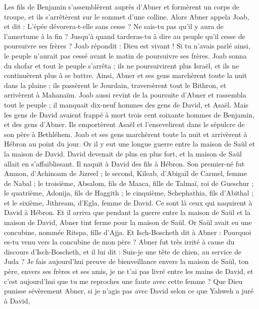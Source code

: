 \begin{multicols}{2}
Les fils de Benjamin s'assemblèrent auprès d'Abner et formèrent un corps de troupe, et ils s'arrêtèrent sur le sommet d'une colline.
Alors Abner appela Joab, et dit : L'épée dévorera-t-elle sans cesse ? Ne sais-tu pas qu'il y aura de l'amertume à la fin ? Jusqu'à quand tarderas-tu à dire au peuple qu'il cesse de poursuivre ses frères ?
Joab répondit : Dieu est vivant ! Si tu n'avais parlé ainsi, le peuple n'aurait pas cessé avant le matin de poursuivre ses frères.
Joab sonna du shofar et tout le peuple s'arrêta ; ils ne poursuivirent plus Israël, et ils ne continuèrent plus à se battre.
Ainsi, Abner et ses gens marchèrent toute la nuit dans la plaine ; ils passèrent le Jourdain, traversèrent tout le Bithron, et arrivèrent à Mahanaïm.
Joab aussi revint de la poursuite d'Abner et rassembla tout le peuple ; il manquait dix-neuf hommes des gens de David, et Asaël.
Mais les gens de David avaient frappé à mort trois cent soixante hommes de Benjamin, et des gens d'Abner.
Ils emportèrent Asaël et l'ensevelirent dans le sépulcre de son père à Bethléhem. Joab et ses gens marchèrent toute la nuit et arrivèrent à Hébron au point du jour.
\VerseOne{}Or il y eut une longue guerre entre la maison de Saül et la maison de David. David devenait de plus en plus fort, et la maison de Saül allait en s'affaiblissant.
Il naquit à David des fils à Hébron. Son premier-né fut Amnon, d'Achinoam de Jizreel ;
le second, Kileab, d'Abigaïl de Carmel, femme de Nabal ; le troisième, Absalom, fils de Maaca, fille de Talmaï, roi de Gueschur ;
le quatrième, Adonija, fils de Haggith ; le cinquième, Schephathia, fils d'Abithal ;
et le sixième, Jithream, d'Egla, femme de David. Ce sont là ceux qui naquirent à David à Hébron.
Et il arriva que pendant la guerre entre la maison de Saül et la maison de David, Abner tint ferme pour la maison de Saül.
Or Saül avait eu une concubine, nommée Ritspa, fille d'Ajja. Et Isch-Boscheth dit à Abner : Pourquoi es-tu venu vers la concubine de mon père ?
Abner fut très irrité à cause du discours d'Isch-Boscheth, et il lui dit : Suis-je une tête de chien, au service de Juda ? Je fais aujourd'hui preuve de bienveillance envers la maison de Saül, ton père, envers ses frères et ses amis, je ne t'ai pas livré entre les mains de David, et c'est aujourd'hui que tu me reproches une faute avec cette femme ?
Que Dieu punisse sévèrement Abner, si je n'agis pas avec David selon ce que Yahweh a juré à David,

\end{multicols}
